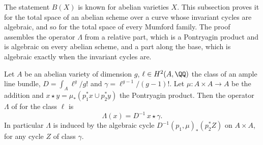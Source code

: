 The statement $B(X)$ is known for abelian varieties $X$. This subsection
proves it for the total space
of an abelian scheme over a curve whose invariant cycles are algebraic, and
so for the total space of every Mumford family. The proof assembles the
operator $\Lambda$ from a relative part, which is a Pontryagin product and is
algebraic on every abelian scheme, and a part along the base, which is
algebraic exactly when the invariant cycles are.

\begin{proposition}
\label{prop:pontryaginlambda}
Let $A$ be an abelian variety of dimension $g$, $\ell\in H^{2}(A,\QQ)$ the
class of an ample line bundle, $D=\int_{A}\ell^{g}/g!$ and
$\gamma=\ell^{g-1}/(g-1)!$. Let $\mu\colon A\times A\to A$ be the addition
and $x\star y=\mu_{*}(p_{1}^{*}x\cup p_{2}^{*}y)$ the Pontryagin product.
Then the operator $\Lambda$ of \cite[Definition~10.6]{paperI} for the class $\ell$ is
\[
  \Lambda(x)=D^{-1}\,x\star\gamma .
\]
In particular $\Lambda$ is induced by the algebraic cycle
$D^{-1}(p_{1},\mu)_{*}(p_{2}^{*}Z)$ on $A\times A$, for any cycle $Z$ of
class $\gamma$.
\end{proposition}

